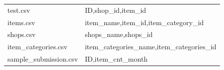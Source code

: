 \documentclass{tikzposter} %
\begin{document}
\begin{columns}
{\begin{tabular}{ p{15cm}p{22cm}}
  test.csv             & ID,shop\_id,item\_id   \\

  items.csv            &  item\_name,item\_id,item\_category\_id   \\
  shops.csv          &  shops\_name,shops\_id   \\
  item\_categories.csv         &  item\_categories\_name,item\_categories\_id \\
  sample\_submission.csv      &  ID,item\_cnt\_month \\
   \bottomrule
\end{tabular}
  	
  	
}
\end{columns}
\end{document}
